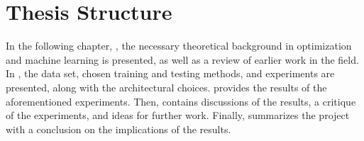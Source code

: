 \section{Thesis Structure}

In the following chapter, , the necessary theoretical background in optimization and machine learning is presented, as well as a review of earlier work in the field. In , the data set, chosen training and testing methods, and experiments are presented, along with the architectural choices.  provides the results of the aforementioned experiments. Then,  contains discussions of the results, a critique of the experiments, and ideas for further work. Finally,  summarizes the project with a conclusion on the implications of the results. 



